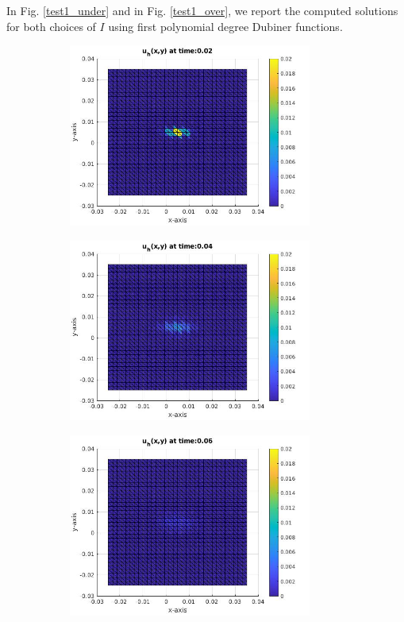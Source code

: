 \documentclass[a4paper,11pt]{article}
\begin{document}
\noindent In Fig. \ref{test1_under} and in Fig. \ref{test1_over}, we report the computed solutions for both choices of $I$ using first polynomial degree Dubiner functions.
\newpage
{} 
\begin{figure}[h] \captionsetup{size = large} \caption{Test-case 1, computed snapshots for underflow case ($I=500 \cdot 10^3 Am^{-3}$)} \label{test1_under}
	\centering
	\begin{subfigure}{0.4\textwidth}
		\includegraphics[width = 8cm]{./tc1-1/002.jpg}
	\end{subfigure}
	\begin{subfigure}{0.4\textwidth}
		\includegraphics[width =8cm]{./tc1-1/004.jpg}
	\end{subfigure}
	\begin{subfigure}{0.4\textwidth}
		\includegraphics[width = 8cm]{./tc1-1/006.jpg}

\end{subfigure}
\end{figure}
\end{document}
